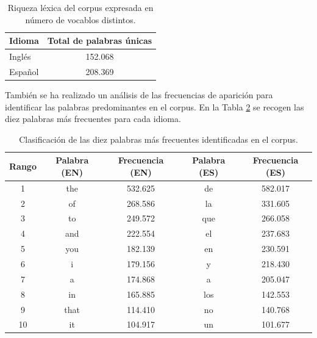 \begin{table}[t]
\centering
\begin{tabular}{lc}
\hline
\textbf{Idioma} & \textbf{Total de palabras únicas} \\ \hline
Inglés          & 152.068                           \\
Español         & 208.369                           \\ \hline
\end{tabular}
\caption{Riqueza léxica del corpus expresada en número de vocablos distintos.}
\label{tab:palabras_unicas}
\end{table}


También se ha realizado un análisis de las frecuencias de aparición para identificar las palabras predominantes en el corpus. 
En la Tabla \ref{tab:frecuencias} se recogen las diez palabras más frecuentes para cada idioma. 

\begin{table}[t]
\centering
\begin{tabular}{ccccc}
\hline
\textbf{Rango} & \textbf{Palabra (EN)} & \textbf{Frecuencia (EN)} & \textbf{Palabra (ES)} & \textbf{Frecuencia (ES)} \\ \hline
1              & the                   & 532.625                  & de                    & 582.017                  \\
2              & of                    & 268.586                  & la                    & 331.605                  \\
3              & to                    & 249.572                  & que                   & 266.058                  \\
4              & and                   & 222.554                  & el                    & 237.683                  \\
5              & you                   & 182.139                  & en                    & 230.591                  \\
6              & i                     & 179.156                  & y                     & 218.430                  \\
7              & a                     & 174.868                  & a                     & 205.047                  \\
8              & in                    & 165.885                  & los                   & 142.553                  \\
9              & that                  & 114.410                  & no                    & 140.768                  \\
10             & it                    & 104.917                  & un                    & 101.677                  \\ \hline
\end{tabular}
\caption{Clasificación de las diez palabras más frecuentes identificadas en el corpus.}
\label{tab:frecuencias}
\end{table}

